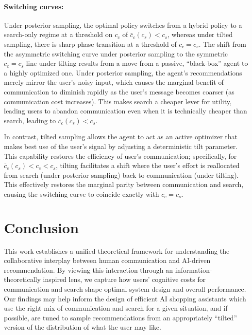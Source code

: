 \documentclass[12pt]{article}
\theoremstyle{definition}
\theoremstyle{remark}
\begin{document}
\paragraph{Switching curves:} Under posterior sampling, the optimal policy switches from a hybrid policy to a search-only regime at a threshold on $c_c$ of $\bar c_c(c_s) < c_s$, whereas under tilted sampling, there is sharp phase transition at a threshold of $c_c=c_s$. The shift from the asymmetric switching curve under posterior sampling to the symmetric $c_c = c_s$ line under tilting results from a move from a passive, ``black-box'' agent to a highly optimized one. Under posterior sampling, the agent's recommendations merely mirror the user's noisy input, which causes the marginal benefit of communication to diminish rapidly as the user’s message becomes coarser (as communication cost increases). This makes search a cheaper lever for utility, leading users to abandon communication even when it is technically cheaper than search, leading to $\bar{c}_c(c_s) < c_s$.

In contrast, tilted sampling allows the agent to act as an active optimizer that makes best use of the user's signal by adjusting a deterministic tilt parameter. This capability restores the efficiency of user's communication; specifically, for $\bar c_c(c_s) < c_c < c_s$, tilting facilitates a shift where the user’s effort is reallocated from search (under posterior sampling) back to communication (under tilting). This effectively restores the marginal parity between communication and search, causing the switching curve to coincide exactly with $c_c = c_s$.

\section{Conclusion}
This work establishes a unified theoretical framework for understanding the collaborative interplay between human communication and AI-driven recommendation. By viewing this interaction through an information-theoretically inspired lens, we capture how users’ cognitive costs for communication and search shape optimal system design and overall performance. Our findings may help inform the design of efficient AI shopping assistants which use the right mix of communication and search for a given situation, and if possible, are tuned to sample recommendations from an appropriately ``tilted'' version of the distribution of what the user may like.



\end{document}
